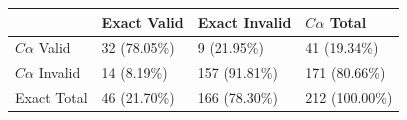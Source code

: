 \begin{tabular}{llll}
\toprule
 & Exact Valid & Exact Invalid & $C\alpha$ Total \\
\midrule
$C\alpha$ Valid & 32 (78.05\%) & 9 (21.95\%) & 41 (19.34\%) \\
$C\alpha$ Invalid & 14 (8.19\%) & 157 (91.81\%) & 171 (80.66\%) \\
Exact Total & 46 (21.70\%) & 166 (78.30\%) & 212 (100.00\%) \\
\bottomrule
\end{tabular}
